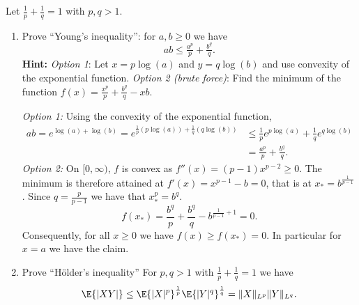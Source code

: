 \begin{exercise}
    \label{ex: hölder's inequality}
    Let \(\frac1p + \frac1q = 1\) with \(p,q > 1\).
    \begin{enumerate}[label=(\alph*)]
        \item Prove ``Young's inequality'': for \(a,b \ge 0\) we have
        \[
            ab \le \tfrac{a^p}p + \tfrac{b^q}q.
        \]
        \textbf{Hint:} \emph{Option 1}: Let \(x = p \log(a)\) and \(y = q \log(b)\)
        and use convexity of the exponential function.
        \emph{Option 2 (brute force)}: Find the minimum of 
        the function \(f(x) = \frac{x^p}p + \frac{b^q}q - xb\).
        \begin{solution}
            \emph{Option 1:} Using the convexity of the exponential function,
            \[\begin{aligned}
                ab
                = e^{\log(a) + \log(b)}
                = e^{\frac1p (p\log(a)) + \frac1q (q\log(b))}
                &\le \frac1p e^{p\log(a)} + \frac1q e^{q\log(b)}
                \\
                &= \frac{a^p}p + \frac{b^q}q.
            \end{aligned}
            \]
            \emph{Option 2:} On \([0, \infty)\), \(f\) is convex  as \(f''(x) = (p-1)x^{p-2} \ge 0\).
            The minimum is therefore attained at \(f'(x) = x^{p-1} - b = 0\), that is
            at \(x_* = b^{\frac1{p-1}}\). Since \(q= \frac{p}{p-1}\) we have that \(x_*^p = b^q\).
            \[
                f(x_*) = \frac{b^q}p + \frac{b^q}q - b^{\frac{1}{p-1} + 1} = 0.
            \]
            Consequently, for all \(x \ge 0\) we have \(f(x) \ge f(x_*) = 0\).
            In particular for \(x = a\) we have the claim.
        \end{solution}

        \item Prove ``Hölder's inequality'' 
        For \(p,q >1\) with \(\frac1p + \frac1q = 1\) we have
        \[
            \E{\abs{XY}} \le \E{\abs{X}^p}^{\frac1p}\E{\abs{Y}^q}^{\frac1q} = \norm{X}_{L^p} \norm{Y}_{L^q}.
        \]


\end{enumerate}
\end{exercise}
